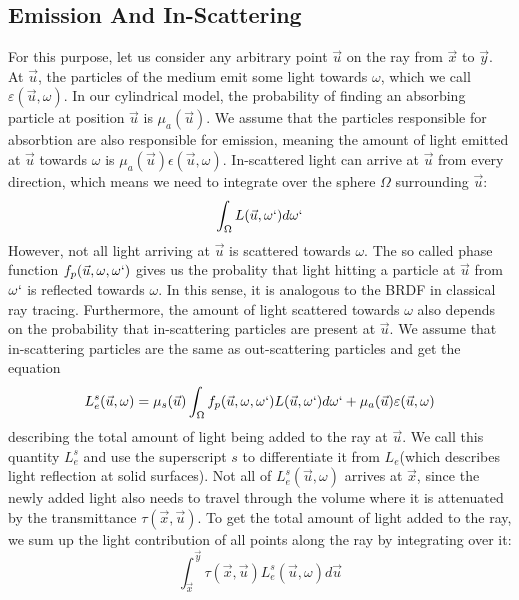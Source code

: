\subsection{Emission And In-Scattering}
For this purpose, let us consider any arbitrary point $\vec{u}$ on the ray from $\vec{x}$ to $\vec{y}$.
At $\vec{u}$, the particles of the medium emit some light towards $\omega$\cite{468400}, which we call $\varepsilon (\vec{u}, \omega )$. In our cylindrical model, the probability of finding an absorbing particle at position $\vec{u}$ is ${\mu}_a(\vec{u})$. We assume that the particles responsible for absorbtion are also responsible for emission\cite{468400}, meaning the amount of light emitted at $\vec{u}$ towards $\omega$ is ${\mu}_a(\vec{u})\epsilon (\vec{u}, \omega )$.
In-scattered light can arrive at $\vec{u}$ from every direction, which means we need to integrate over the sphere $\Omega$ surrounding $\vec{u}$\cite{10.1145/280814.280925}:
\begin{equation}
\int_{\Omega} L(\vec{u}, \omega `)d\omega `
\end{equation}
However, not all light arriving at $\vec{u}$ is scattered towards $\omega $. The so called phase function $f_p(\vec{u}, \omega , \omega `)$ gives us the probality that light hitting a particle at $\vec{u}$ from $\omega `$ is reflected towards $\omega$\cite{10.1145/280814.280925}. In this sense, it is analogous to the BRDF in classical ray tracing. Furthermore, the amount of light scattered towards $\omega $ also depends on the probability that in-scattering particles are present at $\vec{u}$\cite{10.1145/280814.280925}. We assume that in-scattering particles are the same as out-scattering particles and get the equation
\begin{equation}
L_e^s(\vec{u}, \omega ) = {\mu}_s(\vec{u})\int_{\Omega} f_p(\vec{u}, \omega , \omega `)L(\vec{u}, \omega `)d\omega `  + {\mu}_a(\vec{u})\varepsilon (\vec{u}, \omega )
\end{equation}
describing the total amount of light being added to the ray at $\vec{u}$. We call this quantity $L_e^s$ and use the superscript $s$ to differentiate it from $L_e$(which describes light reflection at solid surfaces).
Not all of $L_e^s(\vec{u}, \omega )$ arrives at $\vec{x}$, since the newly added light also needs to travel through the volume where it is attenuated by the transmittance $\tau (\vec{x}, \vec{u})$.
To get the total amount of light added to the ray, we sum up the light contribution of all points along the ray by integrating over it\cite{zhou2007real-time}:
\begin{equation}
\int_{\vec{x}}^{\vec{y}} \tau(\vec{x}, \vec{u})L_e^s(\vec{u}, \omega )d\vec{u}
\end{equation}
